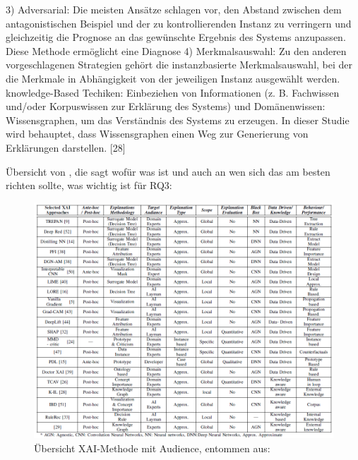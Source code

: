 3) Adversarial: Die meisten Ansätze schlagen vor, den Abstand zwischen dem antagonistischen Beispiel und der zu kontrollierenden Instanz zu verringern und gleichzeitig die Prognose an das gewünschte Ergebnis des Systems anzupassen. Diese Methode ermöglicht eine Diagnose
4) Merkmalsauswahl: Zu den anderen vorgeschlagenen Strategien gehört die instanzbasierte Merkmalsauswahl, bei der die Merkmale in Abhängigkeit von der jeweiligen Instanz ausgewählt werden. 
knowledge-Based Techiken: Einbeziehen von Informationen (z. B. Fachwissen und/oder Korpuswissen zur Erklärung des Systems) und Domänenwissen: Wissensgraphen, um das Verständnis des Systems zu erzeugen. In dieser Studie wird behauptet, dass Wissensgraphen einen Weg zur Generierung von Erklärungen darstellen. [28]

Übersicht von \cite{hanif2021survey}, die sagt wofür was ist und auch an wen sich das am besten richten sollte, was wichtig ist für RQ3:
\begin{figure}
    \centering
    \includegraphics[scale=0.45]{pic/MA-Bilder/Literaturrecherche/21-XAI-Methoden mit Audience.PNG}
    \caption{Übersicht XAI-Methode mit Audience, entommen aus: \cite{hanif2021survey}}
    \label{Fig:XAI-MethodenmitAudience}
\end{figure}



